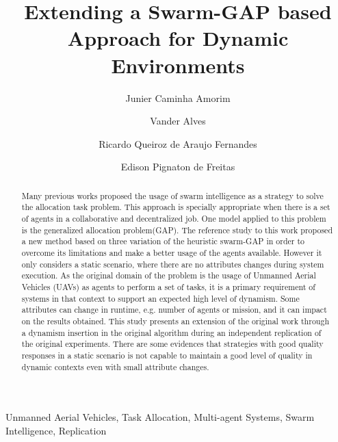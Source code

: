 \documentclass[review]{elsarticle}
\newcommand{\uavs}{UAVs}
\begin{document}
\begin{frontmatter}
	
\title{Extending a Swarm-GAP based Approach for Dynamic Environments}

\author[unbaddress]{Junier Caminha Amorim}

\author[unbaddress]{Vander Alves}

\author[brazilianarmyaddress]{Ricardo Queiroz de Araujo Fernandes}

\author[ufrgsaddress]{Edison Pignaton de Freitas}

\address[unbaddress]{Computation Science Department University of Brasilia, Brazil}
\address[ufrgsaddress]{Institute of Informatics Federal University of Rio Grande do Sul, Brazil}
\address[brazilianarmyaddress]{Software Development Center - Brazilian Army, Brazil}

\begin{abstract}

Many previous works proposed the usage of swarm intelligence as a strategy to solve the allocation task problem. This approach is specially appropriate when there is a set of agents in a collaborative and decentralized job. One model applied to this problem is the generalized allocation problem(GAP). The reference study to this work proposed a new method based on three variation of the heuristic swarm-GAP in order to overcome its limitations and make a better usage of the agents available. However it only considers a static scenario, where there are no attributes changes during system execution. As the original domain of the problem is the usage of Unmanned Aerial Vehicles (\uavs) as agents to perform a set of tasks, it is a primary requirement of systems in that context to support an expected high level of dynamism. Some attributes can change in runtime, e.g. number of agents or mission, and it can impact on the results obtained. This study presents an extension of the original work through a dynamism insertion in the original algorithm during an independent replication of the original experiments. There are some evidences that strategies with good quality responses in a static scenario is not capable to maintain a good level of quality in dynamic contexts even with small attribute changes.

\end{abstract}

\begin{keyword}
Unmanned Aerial Vehicles, Task Allocation, Multi-agent Systems, Swarm Intelligence, Replication
\end{keyword}

\end{frontmatter}
\end{document}
